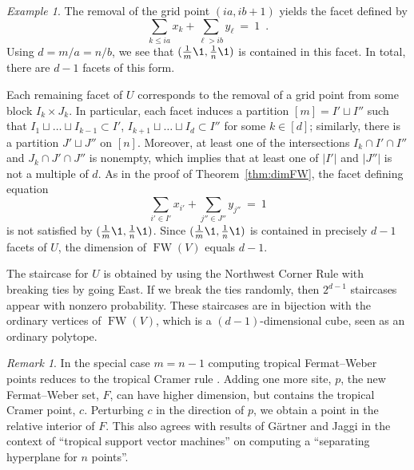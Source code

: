 \documentclass[a4paper,12pt]{amsart}
\DeclareMathOperator{\FW}{FW} %
\theoremstyle{remark}
\newtheorem{example}[theorem]{Example}
\newtheorem{remark}[theorem]{Remark}
\begin{document}
\begin{example}
  The removal of the grid point $(ia,ib+1)$ yields the facet defined by
  \[ \sum_{k\leq ia}x_k+\sum_{\ell>ib}y_\ell \ = \ 1 \enspace. \]
  Using $d={m}/{a}={n}/{b}$, we see that $(\tfrac{1}{m}\1,\tfrac{1}{n}\1)$ is contained in this facet.
  In total, there are $d-1$ facets of this form.
  
  Each remaining facet of $U$ corresponds to the removal of a grid point from some block $I_k\times J_k$.
  In particular, each facet induces a partition $[m]=I'\sqcup I''$ such that $I_1\sqcup\dots\sqcup I_{k-1}\subset I'$, $I_{k+1}\sqcup\dots\sqcup I_{d}\subset I''$ for some $k\in[d]$; similarly, there is a partition $J'\sqcup J''$ on $[n]$.
  Moreover, at least one of the intersections $I_k\cap I'\cap I''$ and $J_k\cap J'\cap J''$ is nonempty, which implies that at least one of $|I'|$ and $|J''|$ is not a multiple of $d$.
  As in the proof of Theorem~\ref{thm:dimFW}, the facet defining equation
  \[ \sum_{i'\in I'}x_{i'}+\sum_{j''\in J''}y_{j''} \ = \ 1 \]
  is not satisfied by $(\tfrac{1}{m}\1,\tfrac{1}{n}\1)$.
  Since $(\tfrac{1}{m}\1,\tfrac{1}{n}\1)$ is contained in precisely $d-1$ facets of $U$, the dimension of $\FW(V)$ equals $d-1$.
  
  The staircase for $U$ is obtained by using the Northwest Corner Rule with breaking ties by going East.
  If we break the ties randomly, then $2^{d-1}$ staircases appear with nonzero probability.
  These staircases are in bijection with the ordinary vertices of $\FW(V)$, which is a $(d{-}1)$-dimensional cube, seen as an ordinary polytope.
\end{example}


\begin{remark}
  In the special case $m=n-1$ computing tropical Fermat--Weber points reduces to the tropical Cramer rule \cite[]{ETC}. 
  Adding one more site, $p$, the new Fermat--Weber set, $F$, can have  
  higher dimension, but contains the tropical Cramer point, $c$.  
  Perturbing $c$ in the direction of $p$, we obtain a point in the relative interior of $F$. This also agrees with results of G\"artner and Jaggi \cite[]{GaertnerJaggi:2006} in the context of \enquote{tropical support vector machines} on computing a \enquote{separating hyperplane for $n$ points}.
\end{remark}
\end{document}
